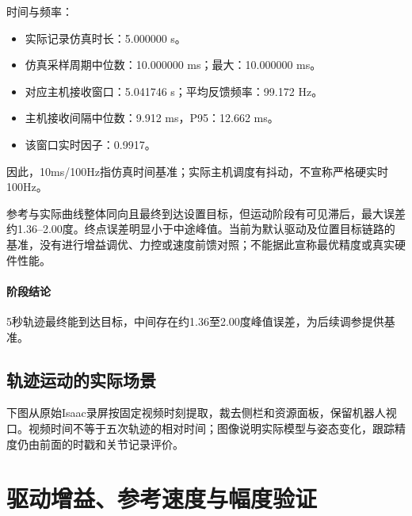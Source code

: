 时间与频率：

\begin{itemize}
\tightlist
\item
  实际记录仿真时长：5.000000 s。
\item
  仿真采样周期中位数：10.000000 ms；最大：10.000000 ms。
\item
  对应主机接收窗口：5.041746 s；平均反馈频率：99.172 Hz。
\item
  主机接收间隔中位数：9.912 ms，P95：12.662 ms。
\item
  该窗口实时因子：0.9917。
\end{itemize}

因此，10ms/100Hz指仿真时间基准；实际主机调度有抖动，不宣称严格硬实时100Hz。



参考与实际曲线整体同向且最终到达设置目标，但运动阶段有可见滞后，最大误差约1.36--2.00度。终点误差明显小于中途峰值。当前为默认驱动及位置目标链路的基准，没有进行增益调优、力控或速度前馈对照；不能据此宣称最优精度或真实硬件性能。


\paragraph{阶段结论}5秒轨迹最终能到达目标，中间存在约1.36至2.00度峰值误差，为后续调参提供基准。



\subsection{轨迹运动的实际场景}
下图从原始Isaac录屏按固定视频时刻提取，裁去侧栏和资源面板，保留机器人视口。视频时间不等于五次轨迹的相对时间；图像说明实际模型与姿态变化，跟踪精度仍由前面的时戳和关节记录评价。



\FloatBarrier

\section{驱动增益、参考速度与幅度验证}


